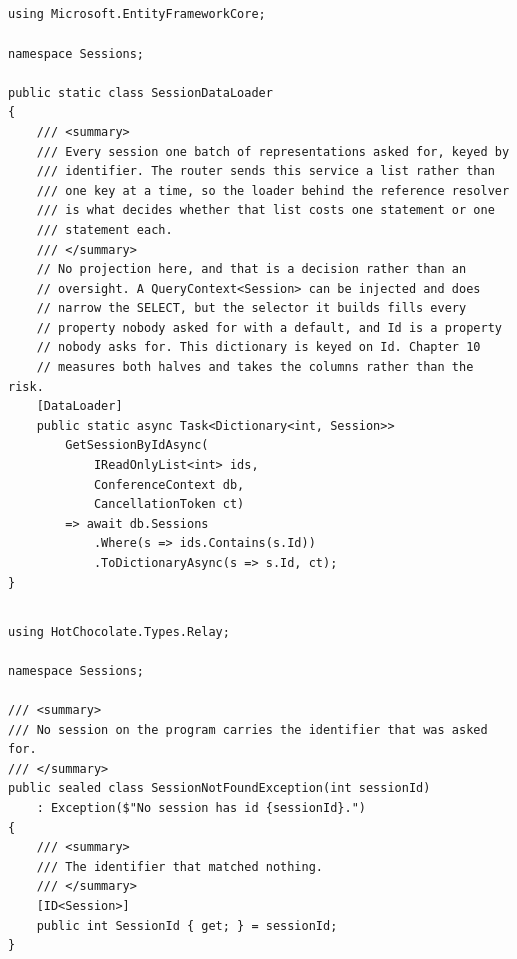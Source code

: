 \subsection*{}
\begin{verbatim}
using Microsoft.EntityFrameworkCore;

namespace Sessions;

public static class SessionDataLoader
{
    /// <summary>
    /// Every session one batch of representations asked for, keyed by
    /// identifier. The router sends this service a list rather than
    /// one key at a time, so the loader behind the reference resolver
    /// is what decides whether that list costs one statement or one
    /// statement each.
    /// </summary>
    // No projection here, and that is a decision rather than an
    // oversight. A QueryContext<Session> can be injected and does
    // narrow the SELECT, but the selector it builds fills every
    // property nobody asked for with a default, and Id is a property
    // nobody asks for. This dictionary is keyed on Id. Chapter 10
    // measures both halves and takes the columns rather than the risk.
    [DataLoader]
    public static async Task<Dictionary<int, Session>>
        GetSessionByIdAsync(
            IReadOnlyList<int> ids,
            ConferenceContext db,
            CancellationToken ct)
        => await db.Sessions
            .Where(s => ids.Contains(s.Id))
            .ToDictionaryAsync(s => s.Id, ct);
}
\end{verbatim}

\subsection*{}
\begin{verbatim}
using HotChocolate.Types.Relay;

namespace Sessions;

/// <summary>
/// No session on the program carries the identifier that was asked for.
/// </summary>
public sealed class SessionNotFoundException(int sessionId)
    : Exception($"No session has id {sessionId}.")
{
    /// <summary>
    /// The identifier that matched nothing.
    /// </summary>
    [ID<Session>]
    public int SessionId { get; } = sessionId;
}
\end{verbatim}


